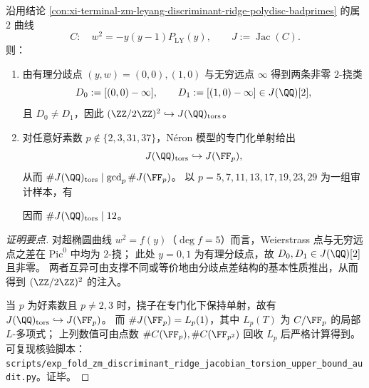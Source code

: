 \begin{conclusion}[判别式二次脊曲线雅可比簇的有理挠子上界：良约化注入与 \texorpdfstring{$\gcd_{p}\#J(\FF_{p})=12$}{gcd\#J(Fp)=12}]\label{con:xi-terminal-zm-discriminant-ridge-jacobian-torsion-upper-bound}
沿用结论 \ref{con:xi-terminal-zm-leyang-discriminant-ridge-polydisc-badprimes} 的属 \(2\) 曲线
\[
C:\quad w^{2}=-y(y-1)P_{\mathrm{LY}}(y),
\qquad
J:=\operatorname{Jac}(C).
\]
则：
\begin{enumerate}
  \item 由有理分歧点 \((y,w)=(0,0),(1,0)\) 与无穷远点 \(\infty\) 得到两条非零 \(2\)-挠类
  \[
  D_{0}:=[(0,0)-\infty],\qquad D_{1}:=[(1,0)-\infty]\in J(\QQ)[2],
  \]
  且 \(D_{0}\neq D_{1}\)，因此 \((\ZZ/2\ZZ)^{2}\hookrightarrow J(\QQ)_{\mathrm{tors}}\)。
  \item 对任意好素数 \(p\notin\{2,3,31,37\}\)，N\'eron 模型的专门化单射给出
  \[
  J(\QQ)_{\mathrm{tors}}\hookrightarrow J(\FF_{p}),
  \]
  从而 \(\#J(\QQ)_{\mathrm{tors}}\mid \gcd_{p}\#J(\FF_{p})\)。
  以 \(p=5,7,11,13,17,19,23,29\) 为一组审计样本，有
  
  因而 \(\#J(\QQ)_{\mathrm{tors}}\mid 12\)。
\end{enumerate}
\end{conclusion}
\begin{proof}[证明要点]
对超椭圆曲线 \(w^{2}=f(y)\)（\(\deg f=5\)）而言，Weierstrass 点与无穷远点之差在 \(\mathrm{Pic}^{0}\) 中均为 \(2\)-挠；
此处 \(y=0,1\) 为有理分歧点，故 \(D_{0},D_{1}\in J(\QQ)[2]\) 且非零。
两者互异可由支撑不同或等价地由分歧点差结构的基本性质推出，从而得到 \((\ZZ/2\ZZ)^2\) 的注入。
\par
当 \(p\) 为好素数且 \(p\neq 2,3\) 时，挠子在专门化下保持单射，故有 \(J(\QQ)_{\mathrm{tors}}\hookrightarrow J(\FF_p)\)。
而 \(\#J(\FF_p)=L_p(1)\)，其中 \(L_p(T)\) 为 \(C/\FF_p\) 的局部 \(L\)-多项式；
上列数值可由点数 \(\#C(\FF_p),\#C(\FF_{p^2})\) 回收 \(L_p\) 后严格计算得到。
可复现核验脚本：\texttt{scripts/exp\_fold\_zm\_discriminant\_ridge\_jacobian\_torsion\_upper\_bound\_audit.py}。证毕。
\end{proof}

